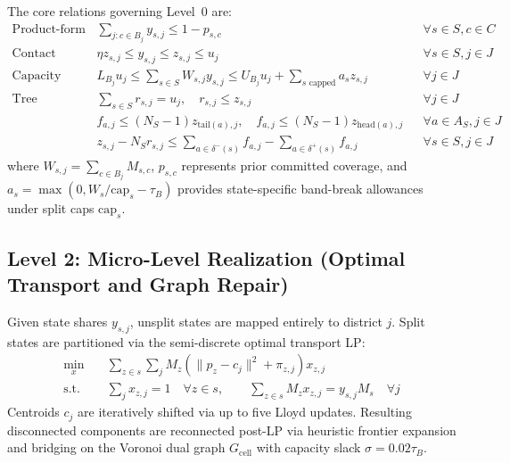 \documentclass[11pt,a4paper]{article}
\theoremstyle{plain}
\theoremstyle{definition}
\begin{document}
The core relations governing Level~0 are:
\begin{align}
    \text{Product-form Coverage:} \quad & \sum_{j : c \in B_j} y_{s,j} \le 1 - p_{s,c} && \forall s \in S, c \in C \label{eq:cover} \\
    \text{Contact Sizing:} \quad & \eta z_{s,j} \le y_{s,j} \le z_{s,j} \le u_j && \forall s \in S, j \in J \label{eq:contact} \\
    \text{Capacity Bands:} \quad & L_{B_j} u_j \le \sum_{s \in S} W_{s,j} y_{s,j} \le U_{B_j} u_j + \sum_{s \text{ capped}} a_s z_{s,j} && \forall j \in J \label{eq:band} \\
    \text{Tree Contiguity:} \quad & \sum_{s \in S} r_{s,j} = u_j, \quad r_{s,j} \le z_{s,j} && \forall j \in J \label{eq:root} \\
    & f_{a,j} \le (N_S-1) z_{\text{tail}(a), j}, \quad f_{a,j} \le (N_S-1) z_{\text{head}(a), j} && \forall a \in A_S, j \in J \label{eq:flow_cap} \\
    & z_{s,j} - N_S r_{s,j} \le \sum_{a \in \delta^-(s)} f_{a,j} - \sum_{a \in \delta^+(s)} f_{a,j} && \forall s \in S, j \in J \label{eq:flow_net}
\end{align}
where $W_{s,j} = \sum_{c \in B_j} M_{s,c}$, $p_{s,c}$ represents prior committed coverage, and $a_s = \max(0, W_s / \text{cap}_s - \tau_B)$ provides state-specific band-break allowances under split caps $\text{cap}_s$.

\subsection{Level 2: Micro-Level Realization (Optimal Transport and Graph Repair)}
Given state shares $y_{s,j}$, unsplit states are mapped entirely to district $j$. Split states are partitioned via the semi-discrete optimal transport LP:
\begin{align}
    \min_{x} \quad & \sum_{z \in s} \sum_{j} M_z \left( \|p_z - c_j\|^2 + \pi_{z,j} \right) x_{z,j} \label{eq:ot_obj} \\
    \text{s.t.} \quad & \sum_{j} x_{z,j} = 1 \quad \forall z \in s, \qquad \sum_{z \in s} M_z x_{z,j} = y_{s,j} M_s \quad \forall j \label{eq:ot_cons}
\end{align}
Centroids $c_j$ are iteratively shifted via up to five Lloyd updates. Resulting disconnected components are reconnected post-LP via heuristic frontier expansion and bridging on the Voronoi dual graph $G_{\text{cell}}$ with capacity slack $\sigma = 0.02 \tau_B$.
\end{document}
